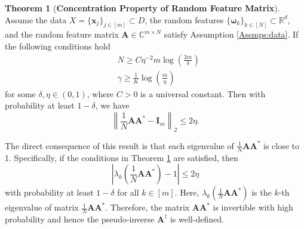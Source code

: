 \documentclass[11pt,twoside]{article}
\theoremstyle{plain}
\theoremstyle{definition}
\newtheorem{theorem}[lemma]{Theorem}
\theoremstyle{remark}
\newcommand{\R}{\mathbb{R}}
\newcommand{\C}{\mathbb{C}}
\newcommand{\Ab}{\mathbf{A}}
\newcommand{\Ib}{\mathbf{I}}
\newcommand{\xb}{\mathbf{x}}
\newcommand{\omegab}{\boldsymbol\omega}
\begin{document}
\begin{theorem}[{\bf Concentration Property of Random Feature Matrix}]
\label{Thm_concentration}
Assume the data $X = \{\xb_j\}_{j\in[m]} \subset D$, the random features $\{ \omegab_k\}_{k\in [N]} \subset\R^d$, and the random feature matrix $\Ab\in\C^{m\times N}$ satisfy Assumption \ref{Assmps:data}. If the following conditions hold
\begin{align}
\label{cond_N}
& N \geq C\eta^{-2}m\log\left(\frac{2m}{\delta}\right) \\
\label{cond_gamma}
& \gamma \geq \frac{1}{K}\log\left(\frac{m}{\eta}\right)
\end{align}
for some $\delta,\eta\in(0,1)$, where $C>0$ is a universal constant. Then with probability at least $1-\delta$, we have
\begin{equation}
\label{concentration}
 \left\|\frac{1}{N}\Ab\Ab^* - \Ib_m\right\|_2 \leq 2\eta. 
\end{equation}
\end{theorem}
The direct consequence of this result is that each eigenvalue of $\frac{1}{N}\Ab\Ab^*$ is close to 1. Specifically, if the conditions in Theorem \ref{Thm_concentration} are satisfied, then 
\begin{equation*}
\left| \lambda_k\left(\frac{1}{N}\Ab\Ab^*\right) -1 \right| \leq 2\eta
\end{equation*}
with probability at least $1-\delta$ for all $k\in[m]$. Here, $\lambda_k(\frac{1}{N}\Ab\Ab^*)$ is the $k$-th eigenvalue of matrix $\frac{1}{N}\Ab\Ab^*$. Therefore, the matrix $\Ab\Ab^*$ is invertible with high probability and hence the pseudo-inverse $\Ab^\dagger$ is well-defined.
\end{document}
